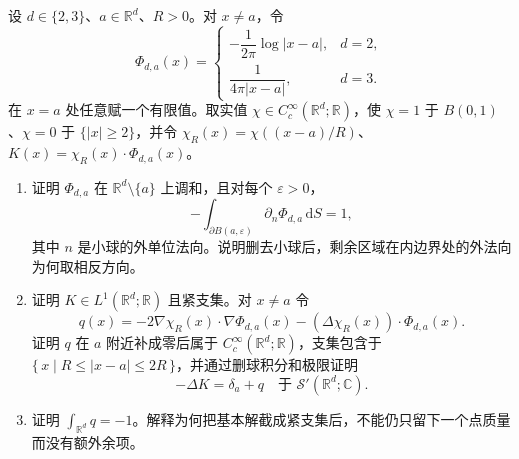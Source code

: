 \begin{exercise}\label{b2:ex:05-cutoff-laplace-kernel}
设 \(d\in\{2,3\}\)、\(a\in\mathbb R^d\)、\(R>0\)。对 \(x\ne a\)，令
\[
 \Phi_{d,a}(x)=
 \begin{cases}
 -\dfrac1{2\pi}\log|x-a|,&d=2,\\[4pt]
 \dfrac1{4\pi|x-a|},&d=3.
 \end{cases}
\]
在 \(x=a\) 处任意赋一个有限值。取实值 \(\chi\in C_c^\infty(\mathbb R^d;\mathbb R)\)，使 \(\chi=1\) 于 \(B(0,1)\)、\(\chi=0\) 于 \(\{|x|\geq2\}\)，并令 \(\chi_R(x)=\chi((x-a)/R)\)、\(K(x)=\chi_R(x)\cdot\Phi_{d,a}(x)\)。
\begin{enumerate}
\item\label{b2:item:05-shifted-harmonic-flux} 证明 \(\Phi_{d,a}\) 在 \(\mathbb R^d\setminus\{a\}\) 上调和，且对每个 \(\varepsilon>0\)，
\[
 -\int_{\partial B(a,\varepsilon)}\partial_n\Phi_{d,a}\,\mathrm dS=1,
\]
其中 \(n\) 是小球的外单位法向。说明删去小球后，剩余区域在内边界处的外法向为何取相反方向。
\item\label{b2:item:05-cutoff-shell-remainder} 证明 \(K\in L^1(\mathbb R^d;\mathbb R)\) 且紧支集。对 \(x\ne a\) 令
\[
 q(x)=-2\nabla\chi_R(x)\cdot\nabla\Phi_{d,a}(x)
       -(\Delta\chi_R(x))\cdot\Phi_{d,a}(x).
\]
证明 \(q\) 在 \(a\) 附近补成零后属于 \(C_c^\infty(\mathbb R^d;\mathbb R)\)，支集包含于 \(\{\,x\mid R\leq|x-a|\leq2R\,\}\)，并通过删球积分和极限证明
\[
 -\Delta K=\delta_a+q\quad\text{于 }\mathcal S'(\mathbb R^d;\mathbb C).
\]
\item\label{b2:item:05-shell-mass} 证明 \(\int_{\mathbb R^d}q=-1\)。解释为何把基本解截成紧支集后，不能仍只留下一个点质量而没有额外余项。
\end{enumerate}
\end{exercise}
